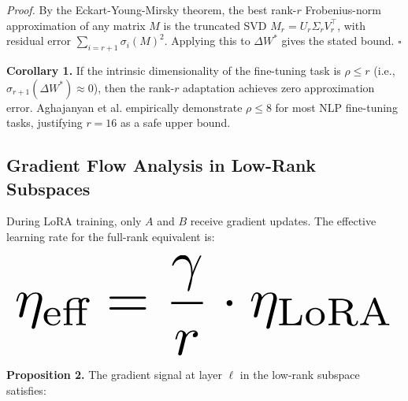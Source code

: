 \documentclass[10pt,twocolumn,letterpaper]{article}
\begin{document}
\textit{Proof.} By the Eckart-Young-Mirsky theorem, the best rank-$r$ Frobenius-norm approximation of any matrix $M$ is the truncated SVD $M_r = U_r\Sigma_r V_r^\top$, with residual error $\sum_{i=r+1} \sigma_i(M)^2$. Applying this to $\Delta W^*$ gives the stated bound. $\square$

\textbf{Corollary 1.} If the intrinsic dimensionality of the fine-tuning task is $\rho \leq r$ (i.e., $\sigma_{r+1}(\Delta W^*) \approx 0$), then the rank-$r$ adaptation achieves zero approximation error. Aghajanyan et al. empirically demonstrate $\rho \leq 8$ for most NLP fine-tuning tasks, justifying $r = 16$ as a safe upper bound.


\subsection{Gradient Flow Analysis in Low-Rank Subspaces}


During LoRA training, only $A$ and $B$ receive gradient updates. The effective learning rate for the full-rank equivalent is:























\begin{equation}
\resizebox{\columnwidth}{!}{$\displaystyle
\begin{aligned}
\eta_{\text{eff}} = \frac{\gamma}{r} \cdot \eta_{\text{LoRA}}
\end{aligned}
$}
\end{equation}























\textbf{Proposition 2.} The gradient signal at layer $\ell$ in the low-rank subspace satisfies:
\end{document}
